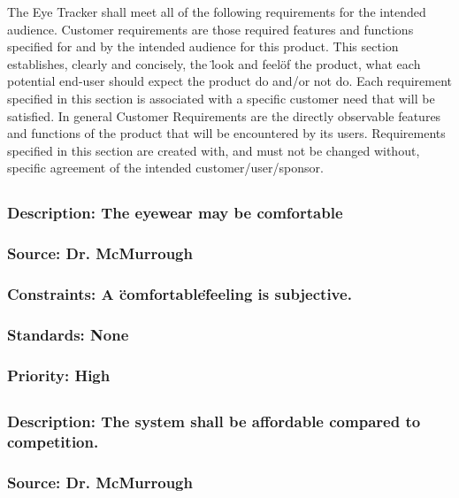 The Eye Tracker shall meet all of the following requirements for the intended audience. Customer requirements are those required features and functions specified for and by the intended audience for this product. This section establishes, clearly and concisely, the \"look and feel\" of the product, what each potential end-user should expect the product do and/or not do. Each requirement specified in this section is associated with a specific customer need that will be satisfied. In general Customer Requirements are the directly observable features and functions of the product that will be encountered by its users. Requirements specified in this section are created with, and must not be changed without, specific agreement of the intended customer/user/sponsor.

\subsection{\bfFeeling}
\subsubsection{Description: The eyewear may be comfortable}
\subsubsection{Source: Dr. McMurrough}
\subsubsection{Constraints: A \"comfortable\" feeling is subjective.}
\subsubsection{Standards: None}
\subsubsection{Priority: High}

\subsection{\bfPricing}
\subsubsection{Description: The system shall be affordable compared to competition.}
\subsubsection{Source: Dr. McMurrough}

